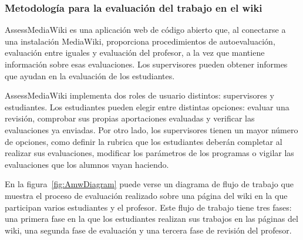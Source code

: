 \subsubsection{Metodología para la evaluación del trabajo en el wiki}

AssessMediaWiki es una aplicación web de código abierto que, al conectarse a una instalación MediaWiki, proporciona procedimientos de autoevaluación, evaluación entre iguales y evaluación del profesor, a la vez que mantiene información sobre esas evaluaciones. Los supervisores pueden obtener informes que ayudan en la evaluación de los estudiantes.

AssessMediaWiki implementa dos roles de usuario distintos: supervisores y estudiantes. Los estudiantes pueden elegir entre distintas opciones: evaluar una revisión, comprobar sus propias aportaciones evaluadas y verificar las evaluaciones ya enviadas. Por otro lado, los supervisores tienen un mayor número de opciones, como definir la rubrica que los estudiantes deberán completar al realizar sus evaluaciones, modificar los parámetros de los programas o vigilar las evaluaciones que los alumnos vayan haciendo.

En la figura~\ref{fig:AmwDiagram} puede verse un diagrama de flujo de trabajo que muestra el proceso de evaluación realizado sobre una página del wiki en la que participan varios estudiantes y el profesor. Este flujo de trabajo tiene tres fases: una primera fase en la que los estudiantes realizan sus trabajos en las páginas del wiki, una segunda fase de evaluación y una tercera fase de revisión del profesor.

